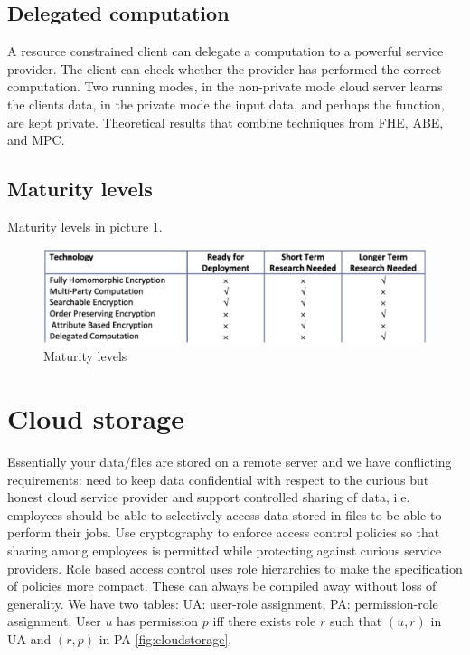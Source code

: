 \subsection{Delegated computation}
A resource constrained client can delegate a computation to a powerful service provider. The client can check whether the provider has performed the correct computation. Two running modes, in the non-private mode cloud server learns the clients data, in the private mode the input data, and perhaps the function, are kept private. Theoretical results that combine techniques from FHE, ABE, and MPC.


\subsection{Maturity levels}

Maturity levels in picture \ref{fig:maturitylevels}.

\begin{figure}
	\centering
	\includegraphics[width=0.7\linewidth]{Images/Chapter8/maturity_levels}
	\caption{Maturity levels}
	\label{fig:maturitylevels}
\end{figure}

\section{Cloud storage}

Essentially your data/files are stored on a remote server and we have conflicting requirements: need to keep data confidential with respect to the curious but honest cloud service provider and support controlled sharing of data, i.e. employees should be able to selectively access data stored in files to be able to perform their jobs. Use cryptography to enforce access control policies so that sharing among employees is permitted while protecting against curious service providers. Role based access control uses role hierarchies to make the specification of policies more compact. These can always be compiled away without loss of generality. We have two tables: UA: user-role assignment, PA: permission-role assignment. User $u$ has permission $p$ iff there exists role $r$ such that $(u,r)$ in UA and $(r,p)$ in PA \ref{fig:cloudstorage}.

